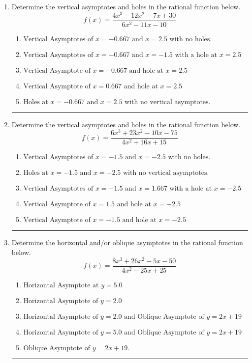 \documentclass[14pt]{extbook}
\newcommand{\litem}[1]{\item#1\hspace*{-1cm}\rule{\textwidth}{0.4pt}}
\begin{document}
\begin{enumerate}
{\begin{enumerate}[label=\Alph*.]
\end{enumerate} }
\litem{
Determine the vertical asymptotes and holes in the rational function below.\[ f(x) = \frac{4x^{3} -12 x^{2} -7 x + 30}{6x^{2} -11 x -10} \]\begin{enumerate}[label=\Alph*.]
\item \( \text{Vertical Asymptotes of } x = -0.667 \text{ and } x = 2.5 \text{ with no holes.} \)
\item \( \text{Vertical Asymptotes of } x = -0.667 \text{ and } x = -1.5 \text{ with a hole at } x = 2.5 \)
\item \( \text{Vertical Asymptote of } x = -0.667 \text{ and hole at } x = 2.5 \)
\item \( \text{Vertical Asymptote of } x = 0.667 \text{ and hole at } x = 2.5 \)
\item \( \text{Holes at } x = -0.667 \text{ and } x = 2.5 \text{ with no vertical asymptotes.} \)

\end{enumerate} }
\litem{
Determine the vertical asymptotes and holes in the rational function below.\[ f(x) = \frac{6x^{3} +23 x^{2} -10 x -75}{4x^{2} +16 x + 15} \]\begin{enumerate}[label=\Alph*.]
\item \( \text{Vertical Asymptotes of } x = -1.5 \text{ and } x = -2.5 \text{ with no holes.} \)
\item \( \text{Holes at } x = -1.5 \text{ and } x = -2.5 \text{ with no vertical asymptotes.} \)
\item \( \text{Vertical Asymptotes of } x = -1.5 \text{ and } x = 1.667 \text{ with a hole at } x = -2.5 \)
\item \( \text{Vertical Asymptote of } x = 1.5 \text{ and hole at } x = -2.5 \)
\item \( \text{Vertical Asymptote of } x = -1.5 \text{ and hole at } x = -2.5 \)

\end{enumerate} }
\litem{
Determine the horizontal and/or oblique asymptotes in the rational function below.\[ f(x) = \frac{8x^{3} +26 x^{2} -5 x -50}{4x^{2} -25 x + 25} \]\begin{enumerate}[label=\Alph*.]
\item \( \text{Horizontal Asymptote at } y = 5.0 \)
\item \( \text{Horizontal Asymptote of } y = 2.0  \)
\item \( \text{Horizontal Asymptote of } y = 2.0 \text{ and Oblique Asymptote of } y = 2x + 19 \)
\item \( \text{Horizontal Asymptote of } y = 5.0 \text{ and Oblique Asymptote of } y = 2x + 19 \)
\item \( \text{Oblique Asymptote of } y = 2x + 19. \)

\end{enumerate} }
\end{enumerate}
\end{document}
